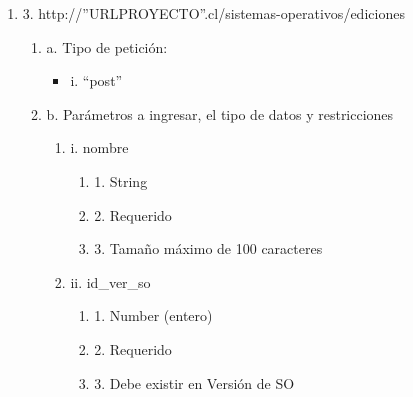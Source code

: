 \begin{enumerate}
    \item 3. http://”URLPROYECTO”.cl/sistemas-operativos/ediciones
    \begin{enumerate}
        \item a. Tipo de petición:
            \begin{itemize}
               \item i. “post”
            \end{itemize}
        \item b. Parámetros a ingresar, el tipo de datos y restricciones
            \begin{enumerate}
                \item i. nombre
                    \begin{enumerate}
                        \item 1. String
                        \item 2. Requerido
                        \item 3. Tamaño máximo de 100 caracteres
                    \end{enumerate}
                \item ii. id\_ver\_so
                    \begin{enumerate}
                        \item 1. Number (entero)
                        \item 2. Requerido
                        \item 3. Debe existir en Versión de SO
                    \end{enumerate}
            \end{enumerate}
    \end{enumerate}


\end{enumerate}

